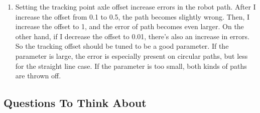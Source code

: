 \documentclass{article}
\begin{document}
\begin{enumerate}
     
     
     
    
    \item Setting the tracking point axle offset increase errors in the robot path. After I increase the offset from 0.1 to 0.5, the path becomes slightly wrong. Then, I increase the offset to 1, and the error of path becomes even larger. On the other hand, if I decrease the offset to 0.01, there's also an increase in errors. So the tracking offset should be tuned to be a good parameter. If the parameter is large, the error is especially present on circular paths, but less for the straight line case. If the parameter is too small, both kinds of paths are thrown off.
\end{enumerate}

\subsection{Questions To Think About} 
\end{document}
